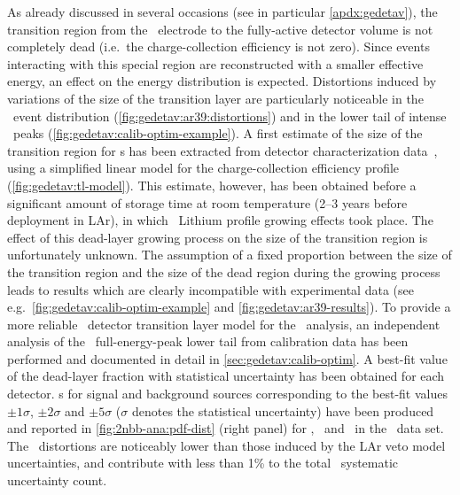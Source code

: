 \begin{description}[wide]
  \item[Transition layer model] As already discussed in several occasions (see in
    particular \cref{apdx:gedetav}), the transition region from the \nplus\ electrode to
    the fully-active detector volume is not completely dead (i.e.~the charge-collection
    efficiency is not zero). Since events interacting with this special region are
    reconstructed with a smaller effective energy, an effect on the energy distribution
    is expected. Distortions induced by variations of the size of the transition layer are
    particularly noticeable in the \Arl\ event distribution
    (\cref{fig:gedetav:ar39:distortions}) and in the lower tail of intense \g\ peaks
    (\cref{fig:gedetav:calib-optim-example}). A first estimate of the size of the
    transition region for \bege{}s has been extracted from detector characterization
    data~\cite{Lehnert2016}, using a simplified linear model for the charge-collection
    efficiency profile (\cref{fig:gedetav:tl-model}). This estimate, however, has been
    obtained before a significant amount of storage time at room temperature (2--3 years
    before deployment in LAr), in which \nplus\ Lithium profile growing effects took
    place. The effect of this dead-layer growing process on the size of the transition
    region is unfortunately unknown. The assumption of a fixed proportion between the size
    of the transition region and the size of the dead region during the growing process
    leads to results which are clearly incompatible with experimental data (see
    e.g.~\cref{fig:gedetav:calib-optim-example} and \cref{fig:gedetav:ar39-results}).
    \newpar
    To provide a more reliable \bege\ detector transition layer model for the \nnbb\
    analysis, an independent analysis of the \Th\ full-energy-peak lower tail from
    calibration data has been performed and documented in detail in
    \cref{sec:gedetav:calib-optim}. A best-fit value of the dead-layer fraction with
    statistical uncertainty has been obtained for each detector. \pdf{}s for signal and
    background sources corresponding to the best-fit values $\pm1\sigma$, $\pm2\sigma$ and
    $\pm5\sigma$ ($\sigma$ denotes the statistical uncertainty) have been produced and
    reported in \cref{fig:2nbb-ana:pdf-dist} (right panel) for \kvn, \kvz\ and \nnbb\ in
    the \enrBEGeII\ data set. The \pdf\ distortions are noticeably lower than those induced
    by the LAr veto model uncertainties, and contribute with less than 1\% to the total
    \thalftwo\ systematic uncertainty count.


\end{description}
